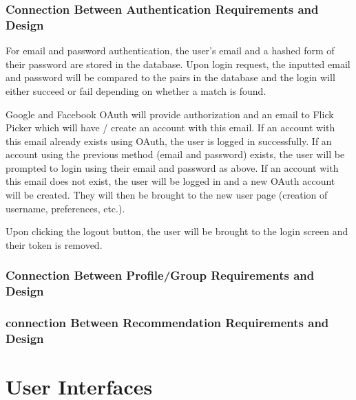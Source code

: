 \documentclass[12pt, titlepage]{article}
\begin{document}
\subsubsection{Connection Between Authentication Requirements and Design}
For email and password authentication, the user's email and a hashed form of their password are stored in the database. Upon login request, the inputted email and password will be compared to the pairs in the database and the login will either succeed or fail depending on whether a match is found. 

Google and Facebook OAuth will provide authorization and an email to Flick Picker which will have / create an account with this email. If an account with this email already exists using OAuth, the user is logged in successfully. If an account using the previous method (email and password) exists, the user will be prompted to login using their email and password as above. If an account with this email does not exist, the user will be logged in and a new OAuth account will be created. They will then be brought to the new user page (creation of username, preferences, etc.). 

Upon clicking the logout button, the user will be brought to the login screen and their token is removed.

\subsubsection{Connection Between Profile/Group Requirements and Design}

\subsubsection{connection Between Recommendation Requirements and Design}


\section{User Interfaces}

\end{document}
